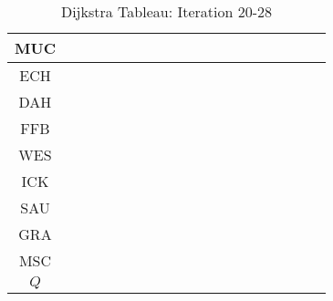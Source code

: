 \begin{table}[H]
\begin{tabular}{|c|*{9}{|p{0.3cm}|p{0.4cm}|}}
MUC &  &  &  &  &  &  &  &  &  &  &  &  &  &  &  &  &  & \\[0.5cm]\hline
ECH &  &  &  &  &  &  &  &  &  &  &  &  &  &  &  &  &  & \\[0.5cm]\hline
DAH &  &  &  &  &  &  &  &  &  &  &  &  &  &  &  &  &  & \\[0.5cm]\hline
FFB &  &  &  &  &  &  &  &  &  &  &  &  &  &  &  &  &  & \\[0.5cm]\hline
WES &  &  &  &  &  &  &  &  &  &  &  &  &  &  &  &  &  & \\[0.5cm]\hline
ICK &  &  &  &  &  &  &  &  &  &  &  &  &  &  &  &  &  & \\[0.5cm]\hline
SAU &  &  &  &  &  &  &  &  &  &  &  &  &  &  &  &  &  & \\[0.5cm]\hline
GRA &  &  &  &  &  &  &  &  &  &  &  &  &  &  &  &  &  & \\[0.5cm]\hline
MSC &  &  &  &  &  &  &  &  &  &  &  &  &  &  &  &  &  & \\[0.5cm]\hline\hline
$Q$ &  &  &  &  &  &  &  &  &  \\[1.3cm]\hline 
\end{tabular} 
\caption{Dijkstra Tableau: Iteration 20-28}
\label{tbl.dijkstra.Stud}
\end{table} 
